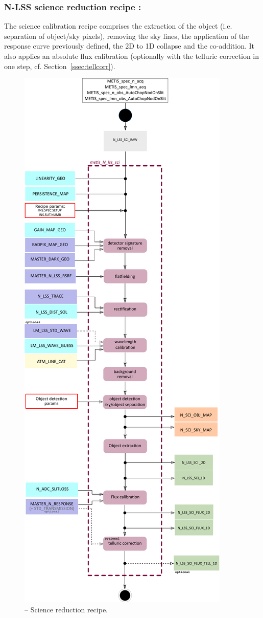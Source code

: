 \subsubsection{N-LSS science reduction recipe :}\label{rec:metis_n_lss_sci}
The science calibration recipe comprises the extraction of the object (i.e. separation of object/sky pixels), removing the sky lines, the application of the response curve previously defined, the 2D to 1D collapse and the co-addition. It also applies an absolute flux calibration (optionally with the telluric correction in one step, cf. Section~\ref{ssec:tellcorr}).
\begin{figure}[ht]
  \centering
  \includegraphics[width=0.35\textheight]{figures/metis_N_lss_sci_v0.83.pdf}
  \caption[Recipe: ]{ --
    Science reduction recipe.}
  \label{Fig:rec_N_lss_sci}
\end{figure}
\clearpage

